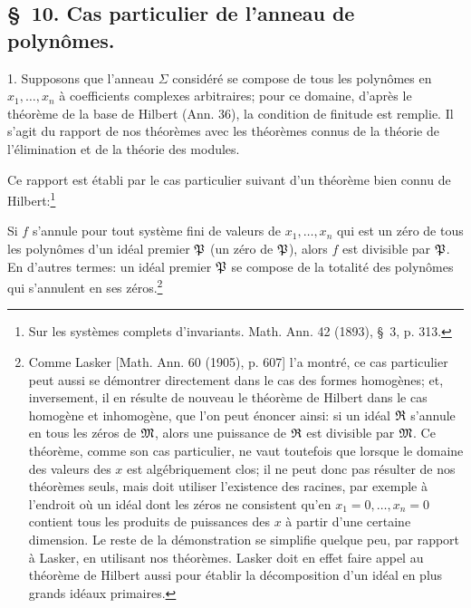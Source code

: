
\setcounter{footnote}{39}
\subsection*{\S~10. Cas particulier de l'anneau de polynômes.}

1. Supposons que l'anneau $\Sigma$ considéré se compose de tous les polynômes en $x_1,
\ldots,x_n$ à coefficients complexes arbitraires; pour ce domaine, d'après le théorème de la base de Hilbert (Ann. 36), la condition de finitude est remplie. Il s'agit du rapport de nos théorèmes avec les théorèmes connus de la théorie de l'élimination et de la théorie des modules.

Ce rapport est établi par le cas particulier suivant d'un théorème bien connu de Hilbert:\footnote{Sur les systèmes complets d'invariants. Math. Ann. 42 (1893), \S~3, p. 313.}

Si $f$ s'annule pour tout système fini de valeurs de $x_1,
\ldots,x_n$ qui est un zéro de tous les polynômes d'un idéal premier $\mathfrak{P}$ (un zéro de $\mathfrak{P}$), alors $f$ est divisible par $\mathfrak{P}$. En d'autres termes: un idéal premier $\mathfrak{P}$ se compose de la totalité des polynômes qui s'annulent en ses zéros.\footnote{Comme Lasker [Math. Ann. 60 (1905), p. 607] l'a montré, ce cas particulier peut aussi se démontrer directement dans le cas des formes homogènes; et, inversement, il en résulte de nouveau le théorème de Hilbert dans le cas homogène et inhomogène, que l'on peut énoncer ainsi: si un idéal $\mathfrak{R}$ s'annule en tous les zéros de $\mathfrak{M}$, alors une puissance de $\mathfrak{R}$ est divisible par $\mathfrak{M}$. Ce théorème, comme son cas particulier, ne vaut toutefois que lorsque le domaine des valeurs des $x$ est algébriquement clos; il ne peut donc pas résulter de nos théorèmes seuls, mais doit utiliser l'existence des racines, par exemple à l'endroit où un idéal dont les zéros ne consistent qu'en $x_1=0,
\ldots,x_n=0$ contient tous les produits de puissances des $x$ à partir d'une certaine dimension. Le reste de la démonstration se simplifie quelque peu, par rapport à Lasker, en utilisant nos théorèmes. Lasker doit en effet faire appel au théorème de Hilbert aussi pour établir la décomposition d'un idéal en plus grands idéaux primaires.}


